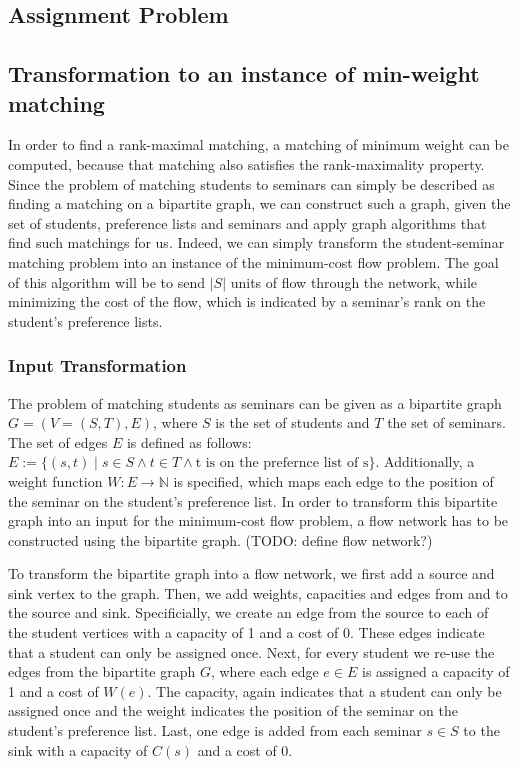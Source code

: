 \subsection{Assignment Problem}

\subsection{Transformation to an instance of min-weight matching}
In order to find a rank-maximal matching, a matching of minimum weight can be computed, because that matching also satisfies the rank-maximality property. Since the problem of matching students to seminars can simply be described as finding a matching on a bipartite graph, we can construct such a graph, given the set of students, preference lists and seminars and apply graph algorithms that find such matchings for us. 
\newline
Indeed, we can simply transform the student-seminar matching problem into an instance of the minimum-cost flow problem. The goal of this algorithm will be to send $|S|$ units of flow through the network, while minimizing the cost of the flow, which is indicated by a seminar's rank on the student's preference lists.

\subsubsection{Input Transformation}
The problem of matching students as seminars can be given as a bipartite graph $G=(V=(S, T), E)$, where $S$ is the set of students and $T$ the set of seminars. The set of edges $E$ is defined as follows: $E:= \{(s, t) \mid s \in S \land t \in T \land \mbox{t is on the prefernce list of s}\}$. Additionally, a weight function $W: E \rightarrow  \mathbb{N}$ is specified, which maps each edge to the position of the seminar on the student's preference list. In order to transform this bipartite graph into an input for the minimum-cost flow problem, a flow network has to be constructed using the bipartite graph. (TODO: define flow network?) 

To transform the bipartite graph into a flow network, we first add a source and sink vertex to the graph. Then, we add weights, capacities and edges from and to the source and sink. Specificially, we create an edge from the source to each of the student vertices with a capacity of 1 and a cost of 0. These edges indicate that a student can only be assigned once. Next, for every student we re-use the edges from the bipartite graph $G$, where each edge $e \in E$ is assigned a capacity of 1 and a cost of $W(e)$. The capacity, again indicates that a student can only be assigned once and the weight indicates the position of the seminar on the student's preference list. Last, one edge is added from each seminar $s \in S$ to the sink with a capacity of $C(s)$ and a cost of 0. 


